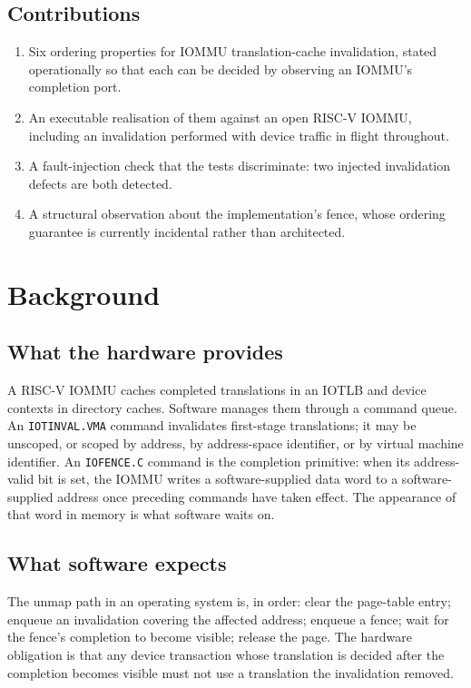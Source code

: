 \documentclass[journal]{IEEEtran}
\newcommand{\cmd}[1]{\mbox{\texttt{#1}}}
\begin{document}
\subsection{Contributions}
\begin{enumerate}
\item Six ordering properties for IOMMU translation-cache invalidation, stated
      operationally so that each can be decided by observing an IOMMU's
      completion port.
\item An executable realisation of them against an open RISC-V IOMMU, including
      an invalidation performed with device traffic in flight throughout.
\item A fault-injection check that the tests discriminate: two injected
      invalidation defects are both detected.
\item A structural observation about the implementation's fence, whose ordering
      guarantee is currently incidental rather than architected.
\end{enumerate}

\section{Background}

\subsection{What the hardware provides}
A RISC-V IOMMU caches completed translations in an IOTLB and device contexts in
directory caches. Software manages them through a command queue. An
\cmd{IOTINVAL.VMA} command invalidates first-stage translations; it may be
unscoped, or scoped by address, by address-space identifier, or by virtual
machine identifier. An \cmd{IOFENCE.C} command is the completion primitive:
when its address-valid bit is set, the IOMMU writes a software-supplied data
word to a software-supplied address once preceding commands have taken effect.
The appearance of that word in memory is what software waits on.

\subsection{What software expects}
The unmap path in an operating system is, in order: clear the page-table entry;
enqueue an invalidation covering the affected address; enqueue a fence; wait for
the fence's completion to become visible; release the page. The hardware
obligation is that any device transaction whose translation is decided after the
completion becomes visible must not use a translation the invalidation removed.
\end{document}
